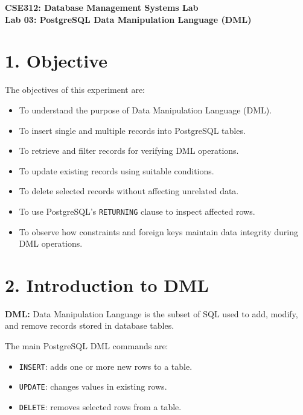 \documentclass[12pt,a4paper]{article}
\newcommand{\defbox}[2]{%
  \vspace{0.2cm}
  \noindent\colorbox{boxgray}{\parbox{\dimexpr\linewidth-2\fboxsep}{%
    \textbf{#1:} #2
  }}
  \vspace{0.2cm}
}
\begin{document}
\begin{center}
    {\Large \textbf{CSE312: Database Management Systems Lab}}\\[0.3cm]
    {\large \textbf{Lab 03: PostgreSQL Data Manipulation Language (DML)}}
\end{center}

\vspace{0.5cm}

\section*{1. Objective}
The objectives of this experiment are:
\begin{itemize}
    \item To understand the purpose of Data Manipulation Language (DML).
    \item To insert single and multiple records into PostgreSQL tables.
    \item To retrieve and filter records for verifying DML operations.
    \item To update existing records using suitable conditions.
    \item To delete selected records without affecting unrelated data.
    \item To use PostgreSQL's \texttt{RETURNING} clause to inspect affected rows.
    \item To observe how constraints and foreign keys maintain data integrity during DML operations.
\end{itemize}

\section*{2. Introduction to DML}
\defbox{DML}{Data Manipulation Language is the subset of SQL used to add, modify, and remove records stored in database tables.}

The main PostgreSQL DML commands are:
\begin{itemize}
    \item \texttt{INSERT}: adds one or more new rows to a table.
    \item \texttt{UPDATE}: changes values in existing rows.
    \item \texttt{DELETE}: removes selected rows from a table.
\end{itemize}
\end{document}
